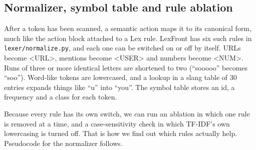\documentclass{ieeeaccess}
\begin{document}
\subsection{Normalizer, symbol table and rule ablation}\label{sec:3.5}
After a token has been scanned, a semantic action maps it to its canonical form, much like the action block attached to a Lex rule. LexFront has six such rules in \texttt{lexer/\allowbreak{}normalize.py}, and each one can be switched on or off by itself. URLs become \textless{}URL\textgreater{}, mentions become \textless{}USER\textgreater{} and numbers become \textless{}NUM\textgreater{}. Runs of three or more identical letters are shortened to two (``sooooo'' becomes ``soo''). Word-like tokens are lowercased, and a lookup in a slang table of 30 entries expands things like ``u'' into ``you''. The symbol table stores an id, a frequency and a class for each token.

Because every rule has its own switch, we can run an ablation in which one rule is removed at a time, and a case-sensitivity check in which TF-IDF's own lowercasing is turned off. That is how we find out which rules actually help. Pseudocode for the normalizer follows.
\end{document}
